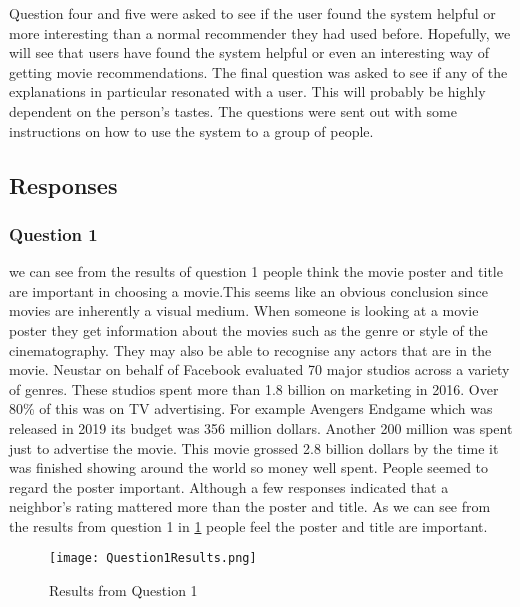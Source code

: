             Question four and five were asked to see if the user found the system helpful or more interesting than a normal recommender they had used before. Hopefully, we will see that users have found the system helpful or even an interesting way of getting movie recommendations. 
            The final question was asked to see if any of the explanations in particular resonated with a user. This will probably be highly dependent on the person's tastes. The questions were sent out with some instructions on how to use the system to a group of people. 
         
        
       \subsection{Responses}

            
            \subsubsection{Question 1}
                we can see from the results of question 1 people think the movie poster and title are important in choosing a movie.This seems like an obvious conclusion since movies are inherently a visual medium. When someone is looking at a movie poster they get information about the movies such as the genre or style of the cinematography. They may also be able to recognise any actors that are in the movie. Neustar on behalf of Facebook evaluated 70 major studios across a variety of genres. These studios spent more than 1.8 billion on marketing in 2016. Over 80\% of this was on TV advertising. For example Avengers Endgame which was released in 2019 its budget was 356 million dollars. Another 200 million was spent just to advertise the movie. This movie grossed 2.8 billion dollars by the time it was finished showing around the world so money well spent. People seemed to regard the poster important. Although a few responses indicated that a neighbor's rating mattered more than the poster and title. As we can see from the results from question 1 in \ref{fig:Question1Results} people feel the poster and title are important.


                \begin{figure}
                    \centering
                    \texttt{[image: Question1Results.png]}
                    \caption{Results from Question 1}
                    \label{fig:Question1Results}
                \end{figure}



